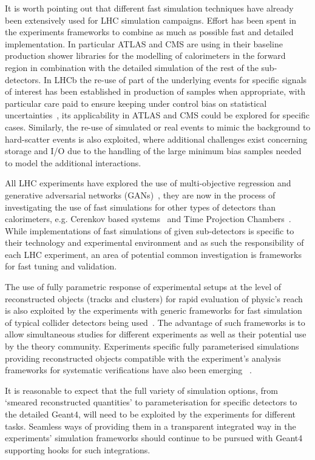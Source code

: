 \documentclass[11pt,a4paper]{article}
\begin{document}
It is worth pointing out that different fast simulation techniques have
already been extensively used for LHC simulation campaigns. Effort has
been spent in the experiments frameworks to combine as much as possible
fast and detailed implementation. In particular ATLAS and CMS are using
in their baseline production shower libraries for the modelling of
calorimeters in the forward region in combination with the detailed
simulation of the rest of the sub-detectors. In LHCb the re-use of part
of the underlying events for specific signals of interest has been
established in production of samples when appropriate, with particular
care paid to ensure keeping under control bias on statistical
uncertainties~\cite{LHCb02}, its applicability in ATLAS and CMS could be
explored for specific cases. Similarly, the re-use of simulated or real
events to mimic the background to hard-scatter events is also exploited,
where additional challenges exist concerning storage and I/O due to the
handling of the large minimum bias samples needed to model the
additional interactions.

All LHC experiments have explored the use of multi-objective regression
and generative adversarial networks (GANs)~\cite{GAN-ATLAS, GAN-LHCb}, they are now in the process of investigating the use of
fast simulations for other types of detectors than calorimeters, e.g.
Cerenkov based systems~\cite{Lamarr} and Time Projection Chambers~\cite{ALICE-TPC}. While implementations of fast simulations of given
sub-detectors is specific to their technology and experimental
environment and as such the responsibility of each LHC experiment, an
area of potential common investigation is frameworks for fast tuning and
validation.

The use of fully parametric response of experimental setups at the level
of reconstructed objects (tracks and clusters) for rapid evaluation of
physic's reach is also exploited by the experiments with generic
frameworks for fast simulation of typical collider detectors being used~\cite{bib-Delphes, PGS4}. 
The advantage of such frameworks is to allow
simultaneous studies for different experiments as well as their
potential use by the theory community. Experiments specific fully
parameterised simulations providing reconstructed objects compatible
with the experiment's analysis frameworks for systematic verifications
have also been emerging~\cite{Lamarr} .

It is reasonable to expect that the full variety of simulation options,
from `smeared reconstructed quantities' to parameterisation for specific
detectors to the detailed Geant4, will need to be exploited by the
experiments for different tasks. Seamless ways of providing them in a
transparent integrated way in the experiments' simulation frameworks
should continue to be pursued with Geant4 supporting hooks for such
integrations.
\end{document}
